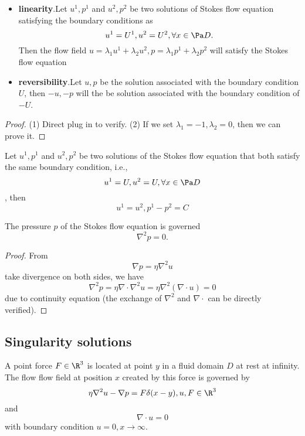 \begin{refsection}
\begin{lemma}\cite[11]{barthes2012microhydrodynamics}\hfill
	\begin{itemize}
		\item \textbf{linearity}.Let $u^1,p^1$ and $u^2,p^2$ be two solutions of Stokes flow equation satisfying the boundary conditions as
		$$u^1 = U^1, u^2 = U^2, \forall x\in \Pa D.$$
		Then the flow field $u = \lambda_1 u^1 + \lambda_2 u^2, p = \lambda_1 p^1 + \lambda_2 p^2$ will satisfy the Stokes flow equation 
		\item \textbf{reversibility}.Let $u, p$ be the solution associated with the boundary condition $U$, then $-u,-p$ will the be solution associated with the boundary condition of $-U$.
	\end{itemize}
\end{lemma}
\begin{proof}
	(1) Direct plug in to verify. (2) If we set $\lambda_1 = -1, \lambda_2 = 0$, then we can prove it.
\end{proof}

\begin{lemma}\cite[12]{barthes2012microhydrodynamics}
	Let $u^1,p^1$ and $u^2,p^2$ be two solutions of the Stokes flow equation that both satisfy the same boundary condition, i.e., 
	$$u^1 = U,u^2 = U,\forall x\in \Pa D$$, then 
	$$u^1 = u^2, p^1-p^2 = C$$
\end{lemma}



\begin{lemma}
	The pressure $p$ of the Stokes flow equation is governed
	$$\nabla^2 p = 0.$$
	
\end{lemma}
\begin{proof}
	From
	$$\nabla p = \eta \nabla^2 u$$
	take divergence on both sides, we have
	$$\nabla^2 p = \eta \nabla \cdot \nabla^2 u = \eta \nabla^2 (\nabla \cdot  u) = 0$$
	due to continuity equation (the exchange of $\nabla^2$ and $\nabla \cdot$ can be directly verified).  
\end{proof}






\subsection{Singularity solutions}


\begin{theorem}\cite[129]{barthes2012microhydrodynamics}
	A point force $F\in \R^3$ is located at point $y$ in a fluid domain $D$ at rest at infinity. The flow flow field at position $x$ created by this force is governed by
	$$  \eta \nabla^2 u - \nabla p = F\delta(x-y),u,F\in \R^3$$
	and 
	$$\nabla \cdot u = 0$$
	with boundary condition $u = 0, x\to \infty$.
	

\end{theorem}
\end{refsection}
